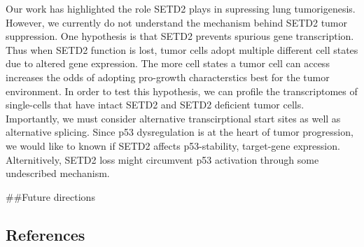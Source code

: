 Our work has highlighted the role SETD2 plays in supressing lung tumorigenesis. However, we currently do not understand the mechanism behind SETD2 tumor suppression. One hypothesis is that SETD2 prevents spurious gene transcription. Thus when SETD2 function is lost, tumor cells adopt multiple different cell states due to altered gene expression. The more cell states a tumor cell can access increases the odds of adopting pro-growth characterstics best for the tumor environment. In order to test this hypothesis, we can profile the transcriptomes of single-cells that have intact SETD2 and SETD2 deficient tumor cells. Importantly, we must consider alternative transcirptional start sites as well as alternative splicing. Since p53 dysregulation is at the heart of tumor progression, we would like to known if SETD2 affects p53-stability, target-gene expression. Alternitively, SETD2 loss might circumvent p53 activation through some undescribed mechanism.

\#\#Future directions

\hypertarget{references}{%
\subsection{References}\label{references}}


